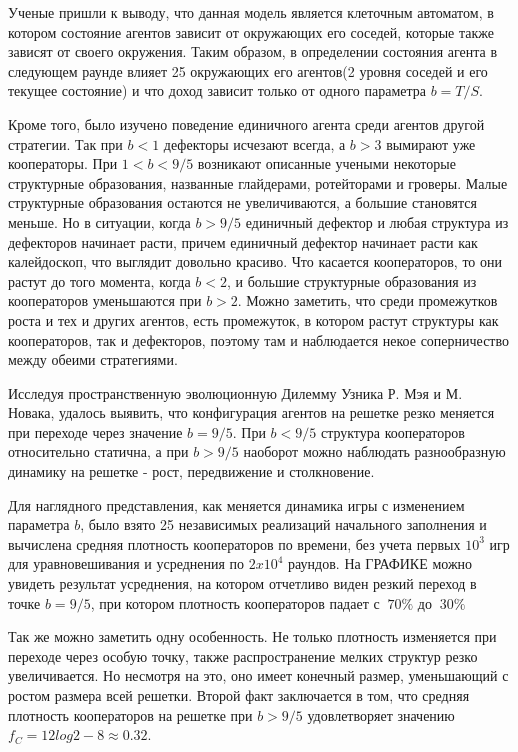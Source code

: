 \documentclass[12pt,a4paper]{article}
\begin{document}
	\par Ученые пришли к выводу, что данная модель является клеточным автоматом, в котором состояние агентов зависит от окружающих его соседей, которые также зависят от своего окружения. Таким образом, в определении состояния агента в следующем раунде влияет 25 окружающих его агентов(2 уровня соседей и его текущее состояние) и что доход зависит только от одного параметра $b=T/S$. 
	
	\par Кроме того, было изучено поведение единичного агента среди агентов другой стратегии. Так при $b<1$ дефекторы исчезают всегда, а $b>3$ вымирают уже кооператоры. При $1<b<9/5$ возникают описанные учеными некоторые структурные образования, названные глайдерами, ротейторами и гроверы. Малые структурные образования остаются не увеличиваются, а большие становятся меньше. Но в ситуации, когда $b>9/5$ единичный дефектор и любая структура из дефекторов начинает расти, причем единичный дефектор начинает расти как калейдоскоп, что выглядит довольно красиво. Что касается кооператоров, то они растут до того момента, когда $b<2$, и большие структурные образования из кооператоров уменьшаются при $b>2$. Можно заметить, что среди промежутков роста и тех и других агентов, есть промежуток, в котором растут структуры как кооператоров, так и дефекторов, поэтому там и наблюдается некое соперничество между обеими стратегиями.
	
	\par Исследуя пространственную эволюционную Дилемму Узника Р. Мэя и М. Новака, удалось выявить, что конфигурация агентов на решетке резко меняется при переходе через значение $b = 9/5$. При $b<9/5$ структура кооператоров относительно статична, а при $b>9/5$ наоборот можно наблюдать разнообразную динамику на решетке - рост, передвижение и столкновение.
	
	\par Для наглядного представления, как меняется динамика игры с изменением параметра $b$, было взято 25 независимых реализаций начального заполнения и вычислена средняя плотность кооператоров по времени, без учета первых $10^{3}$ игр для уравновешивания и усреднения по $2 x 10^{4}$ раундов. На ГРАФИКЕ можно увидеть результат усреднения, на котором отчетливо виден резкий переход в точке $b=9/5$, при котором плотность кооператоров падает с $~70\% $ до $~30\%$
	
	\par Так же можно заметить одну особенность. Не только плотность изменяется при  переходе через особую точку, также распространение мелких структур резко увеличивается. Но несмотря на это, оно имеет конечный размер, уменьшающий с ростом размера всей решетки. Второй факт заключается в том, что средняя плотность кооператоров на решетке при $b>9/5$ удовлетворяет значению $ f_{C} = 12log2-8 \approx 0.32$.
	
\end{document}
